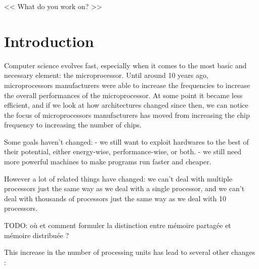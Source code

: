 \begin{savequote}[6cm]
<< What do you work on?  >>
\end{savequote}
\chapter{Introduction}
\chaptertoc

Computer science evolves fast, especially when it comes to the most basic and necessary element: the microprocessor.
Until around 10 years ago, microprocessors manufacturers were able to increase the frequencies to increase the overall performances of the microprocessor.
At some point it became less efficient, and if we look at how architectures changed since then, we can notice the focus of microprocessors manufacturers has moved from increasing the chip frequency to increasing the number of chips.

Some goals haven't changed:
 - we still want to exploit hardwares to the best of their potential, either energy-wise, performance-wise, or both.
 - we still need more powerful machines to make programs run faster and cheaper.

However a lot of related things have changed: we can't deal with multiple processors just the same way as we deal with a single processor, and we can't deal with thousands of processors just the same way as we deal with 10 processors.

TODO: où et comment formuler la distinction entre mémoire partagée et mémoire distribuée ?

This increase in the number of processing units has lead to several other changes :


